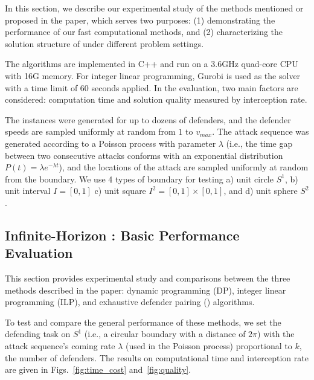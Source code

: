 In this section, we describe our experimental study of the methods mentioned or proposed in the paper, which serves two purposes: (1) demonstrating the performance of our fast computational methods, and (2) characterizing the solution structure of \prob under different problem settings.
%

The algorithms are implemented in C++ and run on a 3.6GHz quad-core CPU with 16G memory.
For integer linear programming, Gurobi \cite{optimization2019gurobi} is used as the solver with a time limit of 60 seconds applied.
In the evaluation, two main factors are considered: computation time and solution quality measured by interception rate. 

The instances were generated for up to dozens of defenders, 
and the defender speeds are sampled uniformly at random from $1$ to $v_{max}$.
The attack sequence was generated according to a Poisson process with parameter $\lambda$ (i.e., the time gap between
two consecutive attacks conforms with an exponential distribution $P(t) = \lambda e^{-\lambda t}$),
and the locations of the attack are sampled uniformly at random from the boundary.
We use 4 types of boundary for testing a) unit circle $S^1$, b) unit interval $I=[0, 1]$
c) unit square $I^2=[0, 1]\times[0,1]$, and d) unit sphere $S^2$.

\subsection{Infinite-Horizon \prob: Basic Performance Evaluation}
This section provides experimental study and comparisons between the three methods described in the paper: 
dynamic programming (DP), integer linear programming (ILP), and exhaustive defender pairing (\ours) algorithms.

To test and compare the general performance of these methods, we set the defending task on $S^1$ (i.e., a circular boundary with a distance of $2\pi$) with the attack sequence's coming rate $\lambda$ (used in the Poisson process) proportional to $k$, the number of defenders. The results on computational time and interception rate are given in Figs.~\ref{fig:time_cost} and~\ref{fig:quality}.


